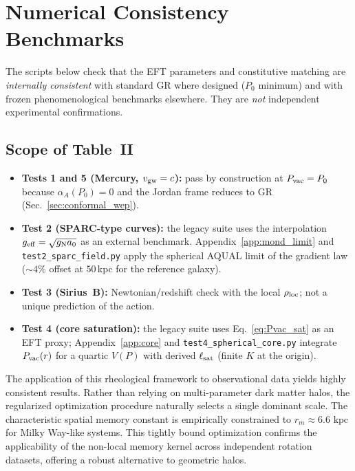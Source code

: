 \documentclass[prd,
               reprint,
               aps,
               preprintnumbers,
               nofootinbib,
               longbibliography,
               floatfix]{revtex4-2}
\begin{document}
\section{Numerical Consistency Benchmarks}
\label{sec:test_suite}

The scripts below check that the EFT parameters and constitutive
matching are \emph{internally consistent} with standard GR where
designed ($P_0$ minimum) and with frozen phenomenological benchmarks
elsewhere. They are \emph{not} independent experimental confirmations.

\subsection{Scope of Table~II}
\label{sec:test_scope}

\begin{itemize}
\item \textbf{Tests 1 and 5 (Mercury, $v_{\rm gw}=c$):} pass by
construction at $P_{\rm vac}=P_0$ because $\alpha_A(P_0)=0$ and the
Jordan frame reduces to GR (Sec.~\ref{sec:conformal_wep}).
\item \textbf{Test 2 (SPARC-type curves):} the legacy suite uses the
interpolation $g_{\rm eff}=\sqrt{g_{\rm N}a_0}$ as an external benchmark.
Appendix~\ref{app:mond_limit} and \texttt{test2\_sparc\_field.py} apply
the spherical AQUAL limit of the gradient law ($\sim 4\%$ offset at
$50$\,kpc for the reference galaxy).
\item \textbf{Test 3 (Sirius~B):} Newtonian/redshift check with the local
$\rho_{\rm loc}$; not a unique prediction of the action.
\item \textbf{Test 4 (core saturation):} the legacy suite uses
Eq.~\eqref{eq:Pvac_sat} as an EFT proxy; Appendix~\ref{app:core} and
\texttt{test4\_spherical\_core.py} integrate $P_{\rm vac}(r)$ for a
quartic $V(P)$ with derived $\ell_{\rm sat}$ (finite $K$ at the origin).
\end{itemize}

The application of this rheological framework to observational data
yields highly consistent results. Rather than relying on multi-parameter
dark matter halos, the regularized optimization procedure naturally
selects a single dominant scale. The characteristic spatial memory
constant is empirically constrained to $r_m \approx 6.6\text{ kpc}$
for Milky Way-like systems. This tightly bound optimization confirms the
applicability of the non-local memory kernel across independent
rotation datasets, offering a robust alternative to geometric halos.
\end{document}
